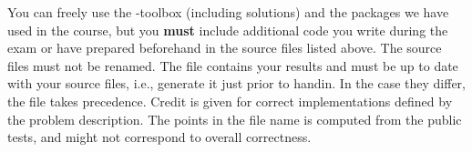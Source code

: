 \documentclass[addpoints]{exam}
\begin{document}
{\begin{center}
{{{You can freely use the -toolbox (including solutions) and the packages we have used in the course,
but you \textbf{must} include additional code you write during the exam or have prepared beforehand in the source files listed above. The source files must not be renamed.
The  file contains your results and must be up to date with your source files, i.e., generate it just prior to handin. In the case they differ, the  file takes precedence.
Credit is given for correct implementations defined by the problem description. The points in the  file name is computed from the public tests, and might not correspond to overall correctness.
\clearpage






}  } }


\end{center}

\qformat{\textbf{\thequestiontitle\dotfill} }





}
\end{document}
